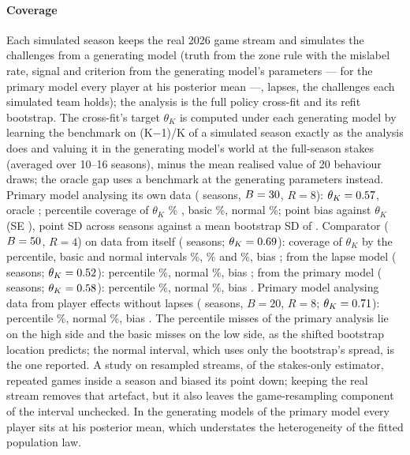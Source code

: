 \documentclass[aoas]{imsart}
\theoremstyle{plain}
\theoremstyle{definition}
\begin{document}
\paragraph{Coverage} Each simulated season keeps the real 2026 game stream and simulates the challenges from a
generating model (truth from the zone rule with the mislabel rate, signal and criterion from the generating model's
parameters --- for the primary model every player at his posterior mean ---, lapses, the challenges each simulated team
holds); the analysis is the full policy cross-fit and its refit bootstrap. The cross-fit's target $\theta_K$ is computed
under each generating model by learning the benchmark on (K$-$1)/K of a simulated season exactly as the analysis does
and valuing it in the generating model's world at the full-season stakes (averaged over 10--16 seasons), minus the mean
realised value of 20 behaviour draws; the oracle gap uses a benchmark at the generating parameters instead. Primary
model analysing its own data (\CPPrimS{} seasons, $B=30$, $R=8$): $\theta_K=0.57$, oracle \CPPrimGap;
percentile coverage of $\theta_K$ \CPPrimKPct\% \CPPrimKPctCI, basic \CPPrimKBasic\%, normal \CPPrimKNormal\%; point bias
against $\theta_K$ \CPPrimBiasK{} (SE \CPPrimBiasSE), point SD across seasons \CPPrimPointSD{} against a mean bootstrap
SD of \CPPrimBootSD. Comparator ($B=50$, $R=4$) on data from itself (\CPMainS{} seasons; $\theta_K=0.69$):
coverage of $\theta_K$ by the percentile, basic and normal intervals \CPMainKPct\%, \CPMainKBasic\% and
\CPMainKNormal\%, bias \CPMainBiasK; from the lapse model (\CPLapseS{} seasons; $\theta_K=0.52$): percentile
\CPLapseKPct\%, normal \CPLapseKNormal\%, bias \CPLapseBiasK; from the primary model (\CPRES{} seasons;
$\theta_K=0.58$): percentile \CPREKPct\%, normal \CPREKNormal\%, bias \CPREBiasK. Primary
model analysing data from player effects without lapses (\CPMisS{} seasons, $B=20$, $R=8$; $\theta_K=0.71$):
percentile \CPMisKPct\%, normal \CPMisKNormal\%, bias \CPMisBiasK. The percentile misses of the primary analysis lie on
the high side and the basic misses on the low side, as the shifted bootstrap location predicts; the normal interval,
which uses only the bootstrap's spread, is the one reported. A study on resampled streams, of the stakes-only estimator, repeated games inside a season and biased its point down; keeping the real stream removes that artefact,
but it also leaves the game-resampling component of the interval unchecked. In the generating models of the primary
model every player sits at his posterior mean, which understates the heterogeneity of the fitted population law.
\end{document}
